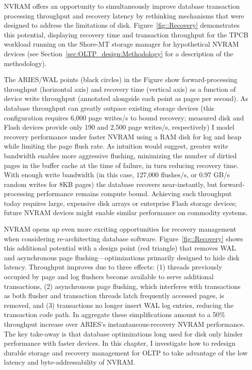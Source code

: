 NVRAM offers an opportunity to simultaneously improve database transaction processing throughput and recovery latency by rethinking mechanisms that were designed to address the limitations of disk.
Figure~\ref{fig::Recovery} demonstrates this potential, displaying recovery time and transaction throughput for the TPCB workload running on the Shore-MT storage manager \cite{JohnsonPandis09} for hypothetical NVRAM devices (see Section~\ref{sec:OLTP_design:Methodology} for a description of the methodology).



The ARIES/WAL points (black circles) in the Figure show forward-processing throughput (horizontal axis) and recovery time (vertical axis) as a function of device write throughput (annotated alongside each point as pages per second).
As database throughput can greatly outpace existing storage devices (this configuration requires 6,000 page writes/s to bound recovery; measured disk and Flash devices provide only 190 and 2,500 page writes/s, respectively) I model recovery performance under faster NVRAM using a RAM disk for log and heap while limiting the page flush rate.
As intuition would suggest, greater write bandwidth enables more aggressive flushing, minimizing the number of dirtied pages in the buffer cache at the time of failure, in turn reducing recovery time.
With enough write bandwidth (in this case, 127,000 flushes/s, or 0.97 GB/s random writes for 8KB pages) the database recovers near-instantly, but forward-processing performance remains compute bound.
Achieving such throughput today requires large, expensive disk arrays or enterprise Flash storage devices; future NVRAM devices might enable similar performance on commodity systems.

NVRAM opens up even more exciting opportunities for recovery management when considering re-architecting database software.
Figure~\ref{fig::Recovery} shows this additional potential with a design point (red triangle) that removes WAL and asynchronous page flushing---optimizations primarily designed to hide disk latency.
Throughput improves due to three effects: (1) threads previously occupied by page and log flushers become available to serve additional transactions, (2) asynchronous page flushing, which interferes with transactions as both flusher and transaction threads latch frequently accessed pages, is removed, and (3) transactions no longer insert WAL log entries, reducing the transaction code path.
In aggregate these simplifications amount to a 50\% throughput increase over ARIES's instantaneous-recovery NVRAM performance.
The key take-away is that database optimizations long used for disk only hinder performance with faster devices.
In this chapter, I investigate how to redesign durable storage and recovery management for OLTP to take advantage of the low latency and byte-addressability of NVRAM.


